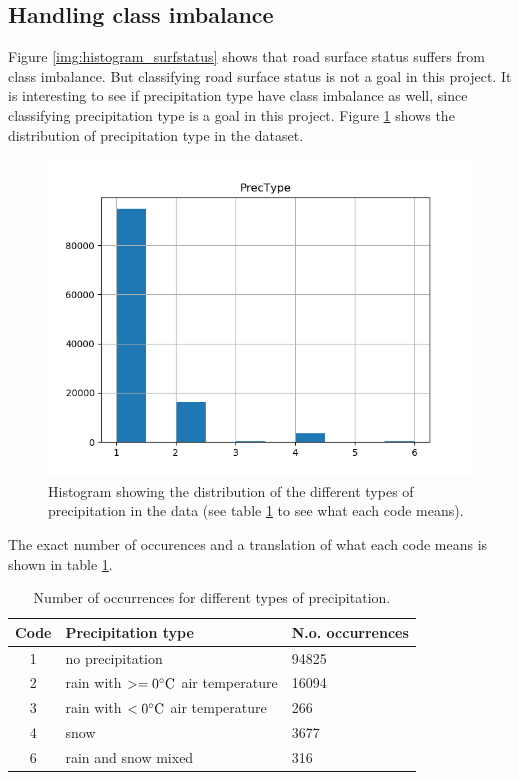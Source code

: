 \subsection{Handling class imbalance} \label{sec:class_imbalance}
	Figure \ref{img:histogram_surfstatus} shows that road surface status suffers from class imbalance. But classifying road surface status is not a goal in this project. It is interesting to see if precipitation type have class imbalance as well, since classifying precipitation type is a goal in this project. Figure \ref{img:histogram_prectype} shows the distribution of precipitation type in the dataset. 
	
	\begin{figure}[H] 
	\centering
	\includegraphics[width=1\textwidth]{media/histogram_prectype.png}
	\caption{Histogram showing the distribution of the different types of precipitation in the data (see table \ref{table:occurences_prectype} to see what each code means).}
	\label{img:histogram_prectype}
	\end{figure}

	The exact number of occurences and a translation of what each code means is shown in table \ref{table:occurences_prectype}.

	\begin{table}[H]
	\centering
	\caption{Number of occurrences for different types of precipitation. }
		\begin{tabular}[3]{c | l | l}
    			Code & Precipitation type & N.o. occurrences \\
    			\hline
			1 & no precipitation & 94825 \\
			2 & rain with $>= 0 \celsius$ air temperature & 16094 \\
			3 & rain with $< 0 \celsius$ air temperature & 266 \\
			4 & snow & 3677 \\
			6 & rain and snow mixed & 316 
			\label{table:occurences_prectype}
		\end{tabular}
	\end{table}

